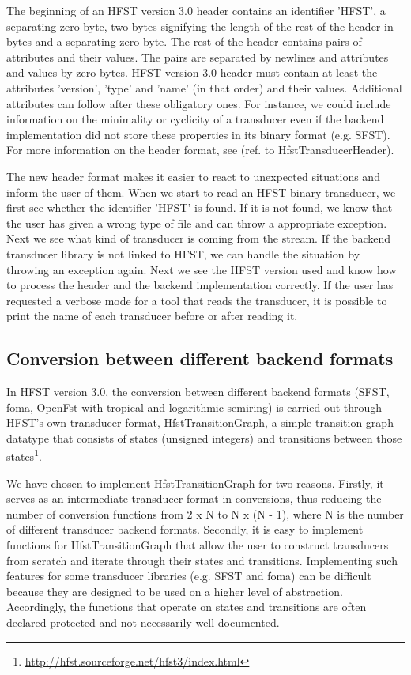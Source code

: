 \documentclass{llncs}
\begin{document}
The beginning of an HFST version 3.0 header contains an identifier
'HFST', a separating zero byte, two bytes signifying the length of
the rest of the header in bytes and a separating zero byte. The rest
of the header contains pairs of attributes and their values. The pairs
are separated by newlines and attributes and values by zero bytes. 
HFST version 3.0 header must contain at least the attributes
'version', 'type' and 'name' (in that order) and their values. 
Additional attributes can follow after these obligatory ones. 
For instance, we could include information on the minimality or
cyclicity of a transducer even if the backend implementation did not
store these properties in its binary format (e.g. SFST). 
For more information on the header format, see (ref. to HfstTransducerHeader).

The new header format makes it easier to react to unexpected
situations and inform the user of them. When we start to read an HFST
binary transducer, we first see whether the identifier 'HFST' is
found. If it is not found, we know that the user has given a wrong
type of file and can throw a appropriate exception. 
Next we see what kind of transducer is coming from the stream. 
If the backend transducer library is not linked to HFST, we can handle
the situation by throwing an exception again. 
Next we see the HFST version used and know how to process the header
and the backend implementation correctly. 
If the user has requested a verbose mode for a tool that reads the
transducer, it is possible to print the name of each transducer 
before or after reading it.

\subsection{Conversion between different backend formats}

In HFST version 3.0, the conversion between different backend formats 
(SFST, foma, OpenFst with tropical and logarithmic semiring) is
carried out through HFST's own transducer format, HfstTransitionGraph, 
a simple transition graph datatype that consists of states (unsigned
integers) and transitions between those 
states\footnote{\url{http://hfst.sourceforge.net/hfst3/index.html}}.
 
We have chosen to implement HfstTransitionGraph for two
reasons. Firstly, it serves as an intermediate transducer format in
conversions, thus reducing the number of conversion functions from 2 x
N to N x (N - 1), where N is the number of different transducer
backend formats. Secondly, it is easy to implement functions for 
HfstTransitionGraph that allow the user to construct transducers from 
scratch and iterate through their states and transitions. Implementing
such features for some transducer libraries (e.g. SFST and foma) can
be difficult because they are designed to be used on a higher level of 
abstraction. Accordingly, the functions that operate on states and 
transitions are often declared protected and not necessarily well
documented.
\end{document}
